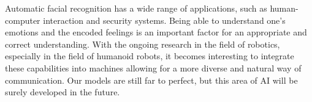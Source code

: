 Automatic facial recognition has a wide range of applications, such as human-computer interaction and security systems. Being able to understand one’s emotions and the encoded feelings is an important factor for an appropriate and correct understanding. With the ongoing research in the field of robotics, especially in the field of humanoid robots, it becomes interesting to integrate these capabilities into machines allowing for a more diverse and natural way of communication. Our models are still far to perfect, but this area of AI will be surely developed in the future.